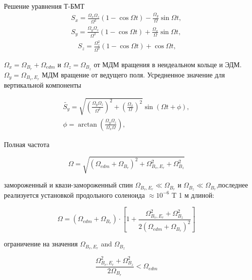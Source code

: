 \begin{frame}
	\par Решение уравнения Т-БМТ
\begin{equation}
	\begin{array}{r}
		S_x=\frac{\Omega_x \Omega_z}{\Omega^2}(1-\cos \Omega t)-\frac{\Omega_y}{\Omega} \sin \Omega t, \\
		S_y=\frac{\Omega_y \Omega_z}{\Omega^2}(1-\cos \Omega t)+\frac{\Omega_x}{\Omega} \sin \Omega t, \\
		\quad S_z=\frac{\Omega_z^2}{\Omega^2}(1-\cos \Omega t)+\cos \Omega t,
	\end{array}
\end{equation}

$\Omega_x=\Omega_{B_r}+\Omega_{e d m}$ и $\Omega_z=\Omega_{B_z}$ от МДМ вращения в неидеальном кольце и ЭДМ. $\Omega_y=\Omega_{B_v, E_r}$ МДМ вращение от ведущего поля. Усредненное значение для вертикальной компоненты

\begin{equation}
	\begin{array}{r}
		\widetilde{S_y}=\sqrt{\left(\frac{\Omega_y \Omega_z}{\Omega^2}\right)^2+\left(\frac{\Omega_x}{\Omega}\right)^2} \sin (\Omega t+\phi), \\
		\phi=\arctan \left(\frac{\Omega_y \Omega_z}{\Omega_x \Omega}\right),
	\end{array}
\end{equation}

\end{frame}

\begin{frame}
	
	Полная частота
	
	\begin{equation}
	\Omega=\sqrt{\left(\Omega_{e d m}+\Omega_{B_r}\right)^2+\Omega_{B_v, E_r}^2+\Omega_{B_z}^2}
	\end{equation}
	
	
	замороженный и квази-замороженный спин $\Omega_{B_v, E_r} \ll \Omega_{B_r}$ и $\Omega_{B_z} \ll \Omega_{B_r}$,последнее реализуется установкой продольного соленоида $\approx 10^{-6}$ T 1 м длиной:
	
	\begin{equation}
	\Omega=\left(\Omega_{e d m}+\Omega_{B_r}\right) \cdot\left[1+\frac{\Omega_{B_v, E_r}^2+\Omega_{B_z}^2}{2\left(\Omega_{e d m}+\Omega_{B_r}\right)^2}\right]
	\end{equation}
	
	ограничение на значения $\Omega_{B_v, E_r}$ and $\Omega_{B_z}$
	
	\begin{equation}
	\frac{\Omega_{B_v, E_r}^2+\Omega_{B_z}^2}{2 \Omega_{B_r}}<\Omega_{e d m}
	\end{equation}
	
\end{frame}

